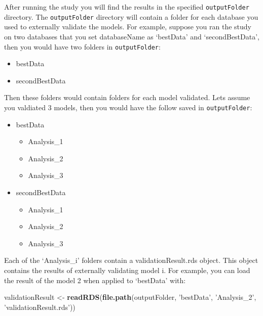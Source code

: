 \documentclass[
]{article}
\newenvironment{Shaded}{\begin{snugshade}}{\end{snugshade}}
\newcommand{\KeywordTok}[1]{\textcolor[rgb]{0.13,0.29,0.53}{\textbf{#1}}}
\newcommand{\NormalTok}[1]{#1}
\newcommand{\StringTok}[1]{\textcolor[rgb]{0.31,0.60,0.02}{#1}}
\providecommand{\tightlist}{%
  \setlength{\itemsep}{0pt}\setlength{\parskip}{0pt}}
\begin{document}
After running the study you will find the results in the specified
\texttt{outputFolder} directory. The \texttt{outputFolder} directory
will contain a folder for each database you used to externally validate
the models. For example, suppose you ran the study on two databases that
you set databaseName as `bestData' and `secondBestData', then you would
have two folders in \texttt{outputFolder}:

\begin{itemize}
\tightlist
\item
  bestData
\item
  secondBestData
\end{itemize}

Then these folders would contain folders for each model validated. Lets
assume you valdiated 3 models, then you would have the follow saved in
\texttt{outputFolder}:

\begin{itemize}
\tightlist
\item
  bestData

  \begin{itemize}
  \tightlist
  \item
    Analysis\_1
  \item
    Analysis\_2
  \item
    Analysis\_3
  \end{itemize}
\item
  secondBestData

  \begin{itemize}
  \tightlist
  \item
    Analysis\_1
  \item
    Analysis\_2
  \item
    Analysis\_3
  \end{itemize}
\end{itemize}

Each of the `Analysis\_i' folders contain a validationResult.rds object.
This object contains the results of externally validating model i. For
example, you can load the result of the model 2 when applied to
`bestData' with:

\begin{Shaded}
\begin{Highlighting}[]
\NormalTok{    validationResult <-}\StringTok{ }\KeywordTok{readRDS}\NormalTok{(}\KeywordTok{file.path}\NormalTok{(outputFolder, }\StringTok{'bestData'}\NormalTok{, }\StringTok{'Analysis_2'}\NormalTok{, }\StringTok{'validationResult.rds'}\NormalTok{))}
\end{Highlighting}
\end{Shaded}
\end{document}
